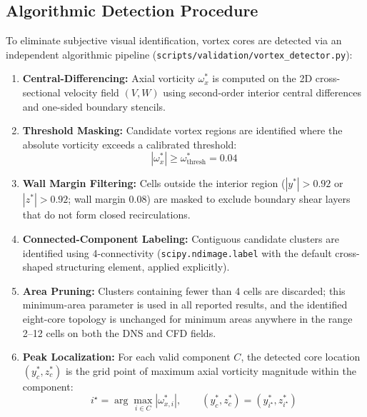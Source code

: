 \documentclass[11pt,a4paper]{article}
\begin{document}
\subsection{Algorithmic Detection Procedure}
To eliminate subjective visual identification, vortex cores are detected via an independent algorithmic pipeline (\texttt{scripts/validation/vortex\_detector.py}):
\begin{enumerate}
    \item \textbf{Central-Differencing:} Axial vorticity $\omega_x^*$ is computed on the 2D cross-sectional velocity field $(V, W)$ using second-order interior central differences and one-sided boundary stencils.
    \item \textbf{Threshold Masking:} Candidate vortex regions are identified where the absolute vorticity exceeds a calibrated threshold:
    \begin{equation}
    |\omega_x^*| \ge \omega_{\text{thresh}}^* = 0.04
    \end{equation}
    \item \textbf{Wall Margin Filtering:} Cells outside the interior region ($|y^*| > 0.92$ or $|z^*| > 0.92$; wall margin $0.08$) are masked to exclude boundary shear layers that do not form closed recirculations.
    \item \textbf{Connected-Component Labeling:} Contiguous candidate clusters are identified using 4-connectivity (\texttt{scipy.ndimage.label} with the default cross-shaped structuring element, applied explicitly).
    \item \textbf{Area Pruning:} Clusters containing fewer than 4 cells are discarded; this minimum-area parameter is used in all reported results, and the identified eight-core topology is unchanged for minimum areas anywhere in the range 2--12 cells on both the DNS and CFD fields.
    \item \textbf{Peak Localization:} For each valid component $C$, the detected core location $(y_c^*, z_c^*)$ is the grid point of maximum axial vorticity magnitude within the component:
    \begin{equation}
    i^\star = \arg\max_{i \in C} |\omega_{x, i}^*|, \qquad (y_c^*, z_c^*) = (y_{i^\star}^*, z_{i^\star}^*)
    \end{equation}
\end{enumerate}
\end{document}
